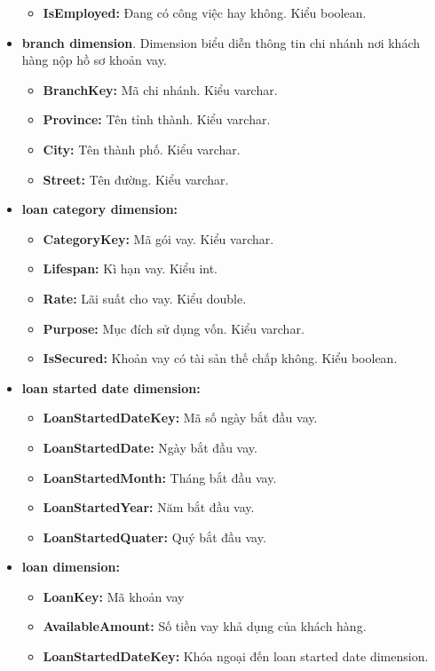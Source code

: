 \documentclass{article}
\begin{document}
\begin{itemize}
\begin{itemize}
        \item \textbf{IsEmployed:} Đang có công việc hay không. Kiểu boolean.
    \end{itemize}
    \item \textbf{branch dimension}. Dimension biểu diễn thông tin chi nhánh nơi khách hàng nộp hồ sơ khoản vay.
    \begin{itemize}
        \item \textbf{BranchKey:} Mã chi nhánh. Kiểu varchar.
        \item \textbf{Province:} Tên tỉnh thành. Kiểu varchar.
        \item \textbf{City:} Tên thành phố. Kiểu varchar.
        \item \textbf{Street:} Tên đường. Kiểu varchar.
    \end{itemize}
    \item \textbf{loan category dimension:}
    \begin{itemize}
        \item \textbf{CategoryKey:} Mã gói vay. Kiểu varchar.
        \item \textbf{Lifespan:} Kì hạn vay. Kiểu int.
        \item \textbf{Rate:} Lãi suất cho vay. Kiểu double.
        \item \textbf{Purpose:} Mục đích sử dụng vốn. Kiểu varchar.
        \item \textbf{IsSecured:} Khoản vay có tài sản thế chấp không. Kiểu boolean.
    \end{itemize}
    
    \item \textbf{loan started date dimension:}
    \begin{itemize}
        \item \textbf{LoanStartedDateKey:} Mã số ngày bắt đầu vay.
        \item \textbf{LoanStartedDate:} Ngày bắt đầu vay.
        \item \textbf{LoanStartedMonth:} Tháng bắt đầu vay.
        \item \textbf{LoanStartedYear:} Năm bắt đầu vay.
        \item \textbf{LoanStartedQuater:} Quý bắt đầu vay.
    \end{itemize}
    
    \item \textbf{loan dimension:} 
    \begin{itemize}
        \item \textbf{LoanKey:} Mã khoản vay
        \item \textbf{AvailableAmount:} Số tiền vay khả dụng của khách hàng.
        \item \textbf{LoanStartedDateKey:} Khóa ngoại đến loan started date dimension. 
    \end{itemize}
\end{itemize}
\end{document}
